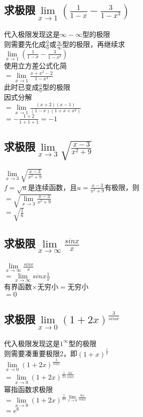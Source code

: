 \documentclass{article}
\begin{document}
\begin{flushleft}
\subsection{
	求极限$\lim\limits_{x\to 1}(\frac{1}{1-x}-\frac{3}{1-x^3})$
}
代入极限发现这是$\infty-\infty$型的极限\\
则需要先化成$\frac{0}{0}$或$\frac{\infty}{\infty}$型的极限，再继续求\\
$\lim\limits_{x\to 1}(\frac{1}{1-x}-\frac{3}{1-x^3})$\\
使用立方差公式化简\\
$=\lim\limits_{x\to 1}\frac{x+x^2-2}{1-x^3}$\\
此时已变成$\frac{0}{0}$型的极限\\
因式分解\\
$=\lim\limits_{x\to 1}\frac{(x+2)(x-1)}{(1-x)(1+x+x^2)}$\\
$=-\frac{1+2}{1+1+1}=-1$\\

\subsection{
	求极限$\lim\limits_{x\to 3}\sqrt{\frac{x-3}{x^2+9}}$
}
$\lim\limits_{x\to 3}\sqrt{\frac{x-3}{x^2+9}}$\\
$f=\sqrt{u}$是连续函数，且$u=\frac{x-3}{x^2+9}$有极限，则\\
$=\sqrt{\lim\limits_{x\to 3}\frac{x-3}{x^2+9}}$\\
$=\sqrt{\frac{1}{6}}$\\

\subsection{
	求极限$\lim\limits_{x\to \infty}\frac{sinx}{x}$
}
$\lim\limits_{x\to \infty}\frac{sinx}{x}$\\
$=\lim\limits_{x\to \infty}sinx\frac{1}{x}$\\
有界函数$\times$无穷小$=$无穷小\\
$=0$\\

\subsection{
求极限$\lim\limits_{x\to 0}(1+2x)^{\frac{3}{sinx}}$
}
代入极限发现这是$1^\infty$型的极限\\
则需要凑重要极限2，即$(1+x)^{\frac{1}{x}}$\\
$\lim\limits_{x\to 0}(1+2x)^{\frac{3}{sinx}}$\\
$=\lim\limits_{x\to 0}(1+2x)^{\frac{1}{2x}\frac{6x}{sinx}}$\\
幂指函数求极限\\
$=\lim\limits_{x\to 0}(1+2x)^{\frac{1}{2x}\lim\limits_{x\to 0}\frac{6x}{sinx}}$\\
$=e^6$\\


\end{flushleft}
\end{document}
